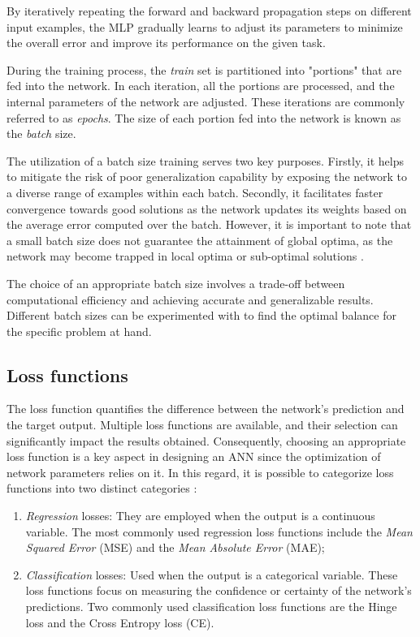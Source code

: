 By iteratively repeating the forward and backward propagation steps on different input examples, the MLP gradually learns to adjust its parameters to minimize the overall error and improve its performance on the given task. 



During the training process, the \textit{train} set is partitioned into "portions" that are fed into the network. In each iteration, all the portions are processed, and the internal parameters of the network are adjusted. These iterations are commonly referred to as \textit{epochs}. The size of each portion fed into the network is known as the \textit{batch} size.

The utilization of a batch size training serves two key purposes. Firstly, it helps to mitigate the risk of poor generalization capability by exposing the network to a diverse range of examples within each batch. Secondly, it facilitates faster convergence towards good solutions as the network updates its weights based on the average error computed over the batch. However, it is important to note that a small batch size does not guarantee the attainment of global optima, as the network may become trapped in local optima or sub-optimal solutions \cite{KANDEL2020312}.

The choice of an appropriate batch size involves a trade-off between computational efficiency and achieving accurate and generalizable results. Different batch sizes can be experimented with to find the optimal balance for the specific problem at hand.

\subsection{Loss functions}

The loss function quantifies the difference between the network's prediction and the target output. Multiple loss functions are available, and their selection can significantly impact the results obtained. Consequently, choosing an appropriate loss function is a key aspect in designing an ANN since the optimization of network parameters relies on it. In this regard, it is possible to categorize loss functions into two distinct categories \cite{CLFML}:
\begin{enumerate}
	\item \textit{Regression} losses: They are employed when the output is a continuous variable. The most commonly used regression loss functions include the \textit{Mean Squared Error} (MSE) and the \textit{Mean Absolute Error} (MAE);
	\item \textit{Classification} losses: Used when the output is a categorical variable. These loss functions focus on measuring the confidence or certainty of the network's predictions. Two commonly used classification loss functions are the Hinge loss and the Cross Entropy loss (CE).
\end{enumerate}

